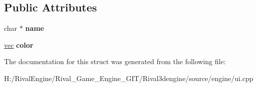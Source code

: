 \subsection*{Public Attributes}
\begin{DoxyCompactItemize}
\item 
\mbox{\label{struct_u_i_1_1_prefab_preview_ac68ee72aed91bdfb58574841d84169cc}} 
char $\ast$ {\bfseries name}
\item 
\mbox{\label{struct_u_i_1_1_prefab_preview_af2e464ea250702bcbc6acc232ddd4df7}} 
\hyperlink{structvec}{vec} {\bfseries color}
\end{DoxyCompactItemize}


The documentation for this struct was generated from the following file\+:\begin{DoxyCompactItemize}
\item 
H\+:/\+Rival\+Engine/\+Rival\+\_\+\+Game\+\_\+\+Engine\+\_\+\+G\+I\+T/\+Rival3dengine/source/engine/ui.\+cpp\end{DoxyCompactItemize}

